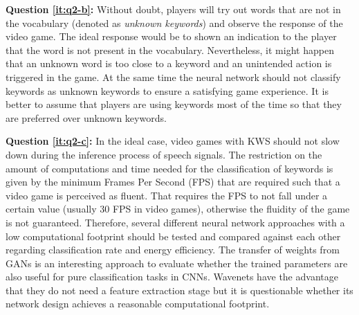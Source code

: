 \textbf{Question \ref{it:q2-b}:} 
Without doubt, players will try out words that are not in the vocabulary (denoted as \emph{unknown keywords}) and observe the response of the video game.
The ideal response would be to shown an indication to the player that the word is not present in the vocabulary. 
Nevertheless, it might happen that an unknown word is too close to a keyword and an unintended action is triggered in the game. 
At the same time the neural network should not classify keywords as unknown keywords to ensure a satisfying game experience.
It is better to assume that players are using keywords most of the time so that they are preferred over unknown keywords.

\textbf{Question \ref{it:q2-c}:}
In the ideal case, video games with KWS should not slow down during the inference process of speech signals.
The restriction on the amount of computations and time needed for the classification of keywords is given by the minimum Frames Per Second (FPS) that are required such that a video game is perceived as fluent.
That requires the FPS to not fall under a certain value (usually 30 FPS in video games), otherwise the fluidity of the game is not guaranteed.
Therefore, several different neural network approaches with a low computational footprint should be tested and compared against each other regarding classification rate and energy efficiency.
The transfer of weights from GANs is an interesting approach to evaluate whether the trained parameters are also useful for pure classification tasks in CNNs.
Wavenets have the advantage that they do not need a feature extraction stage but it is questionable whether its network design achieves a reasonable computational footprint.



